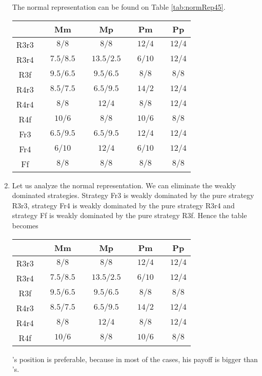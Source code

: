 \begin{enumerate}[label=\alph*.]
	      The normal representation can be found on Table \ref{tab:normRep45}.

	      \begin{center}
	      	\begin{tabular}{c|cccccccc}
	      		       && Mm           && Mp           && Pm           && Pp     \\ \hline
	      		R3r3   && $8 /  8$     && $8  /   8$   && $12  /  4$   && $12 /   4$ \\
	      		R3r4   && $7.5 / 8.5$  && $ 13.5/ 2.5$ && $6  /  10$   && $12  /  4$ \\
	      		R3f    && $9.5 / 6.5 $ && $9.5 / 6.5$  && $8  /   8$   && $8  /   8$ \\
	      		R4r3   && $8.5 /7.5$   && $ 6.5 / 9.5$ && $14  /   2$  && $12 /   4$ \\
	      		R4r4   && $8 /    8$   && $12  /    4$ && $8  /   8$   && $12 /   4$ \\
	      		R4f    && $10 /     6$ && $8  /    8$  && $10 /   6$   && $8  /   8$ \\
	      		Fr3    && $6.5 / 9.5$  && $6.5 / 9.5$  && $12  /  4$   && $12  /  4$ \\
	      		Fr4    && $6 /    10$  && $12  /    4$ && $6  /  10$   && $12  /  4$ \\
	      		Ff     && $8  /   8$   && $8  /   8$   && $8  /   8$   && $8  /   8$
	      	\end{tabular}
	      	\label{tab:normRep45}
	      \end{center}



	\item Let us analyze the normal representation. We can eliminate the weakly dominated strategies. Strategy Fr3 is weakly dominated by the pure strategy R3r3, strategy Fr4 is weakly dominated by the pure strategy R3r4 and strategy Ff is weakly dominated by the pure strategy R3f. Hence the table becomes

	      \begin{center}
	      	\begin{tabular}{c|cccccccc}
	      		       && Mm           && Mp           && Pm           && Pp     \\ \hline
	      		R3r3   && $8 /  8$     && $8  /   8$   && $12  /  4$   && $12 /   4$ \\
	      		R3r4   && $7.5 / 8.5$  && $ 13.5/ 2.5$ && $6  /  10$   && $12  /  4$ \\
	      		R3f    && $9.5 / 6.5 $ && $9.5 / 6.5$  && $8  /   8$   && $8  /   8$ \\
	      		R4r3   && $8.5 /7.5$   && $ 6.5 / 9.5$ && $14  /   2$  && $12 /   4$ \\
	      		R4r4   && $8 /    8$   && $12  /    4$ && $8  /   8$   && $12 /   4$ \\
	      		R4f    && $10 /     6$ && $8  /    8$  && $10 /   6$   && $8  /   8$
	      	\end{tabular}
	      \end{center}

	      \TAone{}'s position is preferable, because in most of the cases, his payoff is bigger than \TAtwo{}'s.




\end{enumerate}
